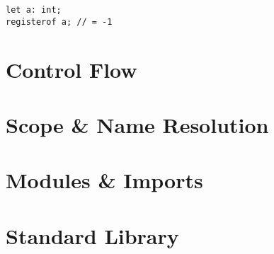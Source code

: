 \documentclass{article}
\begin{document}
    \begin{lstlisting}[language=CustomLang]
let a: int;
registerof a; // = -1
    \end{lstlisting}

    \section{Control Flow}

    \section{Scope \& Name Resolution}\label{sec:scope}

    \section{Modules \& Imports}

    \section{Standard Library}
\end{document}
